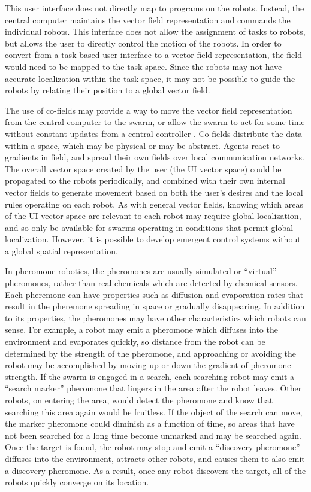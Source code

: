 \documentclass[]{article}
\begin{document}
This user interface does not directly map to programs on the robots. 
Instead, the central computer maintains the vector field representation and commands the individual robots.
This interface does not allow the assignment of tasks to robots, but allows the user to directly control the motion of the robots. 
In order to convert from a task-based user interface to a vector field representation, the field would need to be mapped to the task space. 
Since the robots may not have accurate localization within the task space, it may not be possible to guide the robots by relating their position to a global vector field. 

The use of co-fields may provide a way to move the vector field representation from the central computer to the swarm, or allow the swarm to act for some time without constant updates from a central controller \cite{mamei2003co}.
Co-fields distribute the data within a space, which may be physical or may be abstract. 
Agents react to gradients in field, and spread their own fields over local communication networks. 
The overall vector space created by the user (the UI vector space) could be propagated to the robots periodically, and combined with their own internal vector fields to generate movement based on both the user's desires and the local rules operating on each robot. 
As with general vector fields, knowing which areas of the UI vector space are relevant to each robot may require global localization, and so only be available for swarms operating in conditions that permit global localization. 
However, it is possible to develop emergent control systems without a global spatial representation.

In pheromone robotics, the pheromones are usually simulated or ``virtual'' pheromones, rather than real chemicals which are detected by chemical sensors. 
Each pheremone can have properties such as diffusion and evaporation rates that result in the pheremone spreading in space or gradually disappearing. 
In addition to its properties, the pheromones may have other characteristics which robots can sense. 
For example, a robot may emit a pheromone which diffuses into the environment and evaporates quickly, so distance from the robot can be determined by the strength of the pheromone, and approaching or avoiding the robot may be accomplished by moving up or down the gradient of pheromone strength. 
If the swarm is engaged in a search, each searching robot may emit a ``search marker'' pheromone that lingers in the area after the robot leaves. 
Other robots, on entering the area, would detect the pheromone and know that searching this area again would be fruitless. 
If the object of the search can move, the marker pheromone could diminish as a function of time, so areas that have not been searched for a long time become unmarked and may be searched again. 
Once the target is found, the robot may stop and emit a ``discovery pheromone'' diffuses into the environment, attracts other robots, and causes them to also emit a discovery pheromone. 
As a result, once any robot discovers the target, all of the robots quickly converge on its location. 
\end{document}
